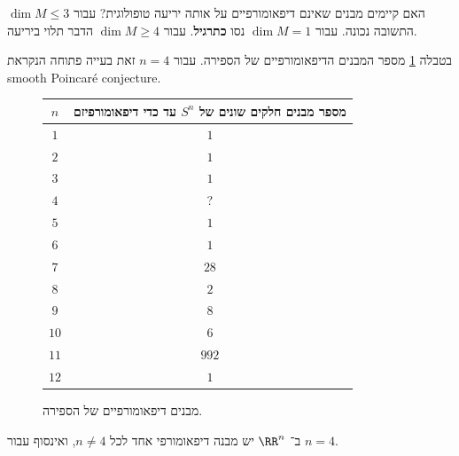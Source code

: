 \documentclass[a4paper,10pt,twoside,openany]{book}
\begin{document}
\begin{question}
האם קיימים מבנים שאינם דיפאומורפיים על אותה יריעה טופולוגית?
עבור
$\dim M \leq 3$
התשובה נכונה.
עבור
$\dim M = 1$
נסו
\textbf{כתרגיל}.
עבור
$\dim M \geq 4$
הדבר תלוי ביריעה.
\end{question}
\begin{example}
בטבלה
\ref{sphere_diffeo}
מספר המבנים הדיפאומורפיים של הספירה.
עבור
$n=4$
זאת בעייה פתוחה הנקראת
\textenglish{smooth Poincaré conjecture}.
\begin{figure}[h!]
\caption{מבנים דיפאומורפיים של הספירה.}
\label{sphere_diffeo}
\centering
\begin{tabular}{|c|c|}
\hline $n$ & מספר מבנים חלקים שונים של $S^n$ עד כדי דיפאומורפיזם \\
\hline $1$ & $1$ \\
\hline $2$ & $1$ \\
\hline $3$ & $1$ \\
\hline $4$ & ? \\
\hline $5$ & $1$ \\
\hline $6$ & $1$ \\
\hline $7$ & $28$ \\
\hline $8$ & $2$ \\
\hline $9$ & $8$ \\
\hline $10$ & $6$ \\
\hline $11$ & $992$ \\
\hline $12$ & $1$ \\
\hline
\end{tabular}
\end{figure}
\end{example}
\begin{example}
ב־%
$\RR^n$
יש מבנה דיפאומורפי אחד לכל
$n \neq 4$,
ואינסוף עבור
$n=4$.
\end{example}
\end{document}
